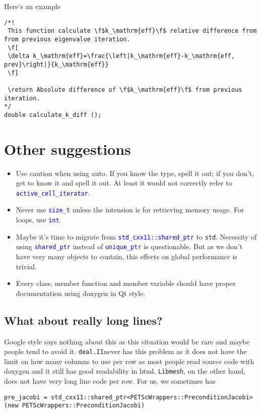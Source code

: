\documentclass{article}
\newcommand{\libmesh}{{\tt Libmesh}}
\newcommand{\dealii}{{\tt deal.II}}
\newcommand{\blue}[1]{\textcolor{blue}{#1}}
\begin{document}
Here's an example
\begin{lstlisting}
/*!
 This function calculate \f$k_\mathrm{eff}\f$ relative difference from from previous eigenvalue iteration.
 \f[
 \delta k_\mathrm{eff}=\frac{\left|k_\mathrm{eff}-k_\mathrm{eff, prev}\right|}{k_\mathrm{eff}}
 \f]
 
 \return Absolute difference of \f$k_\mathrm{eff}\f$ from previous iteration.
*/
double calculate_k_diff ();
\end{lstlisting}


\section{Other suggestions}
\begin{itemize}
	\item Use caution when using auto. If you know the type, spell it out; if you don't, get to know it and spell it out. At least it would not correctly refer to {\tt \blue{active\_cell\_iterator}}.
	\item Never use {\tt \blue{size\_t}} unless the intension is for retrieving memory usage. For loops, use {\tt \blue{int}}.
	\item Maybe it's time to migrate from {\tt \blue{std\_cxx11::shared\_ptr}} to {\tt std}. Necessity of using {\tt \blue{shared\_ptr}} instead of {\tt \blue{unique\_ptr}} is questionable. But as we don't have very many objects to contain, this effects on global performance is trivial.
	\item Every class, member function and member variable should have proper documentation using doxygen in Qt style.
\end{itemize}
\subsection{What about really long lines?}
Google style says nothing about this as this situation would be rare and maybe people tend to avoid it. \dealii never has this problem as it does not have the limit on how many columns to use per row as most people read source code with doxygen and it still has good readability in html. \libmesh, on the other hand, does not have very long line code per row. For us, we sometimes has
\begin{lstlisting}
pre_jacobi = std_cxx11::shared_ptr<PETScWrappers::PreconditionJacobi> (new PETScWrappers::PreconditionJacobi)
\end{lstlisting}
\end{document}
